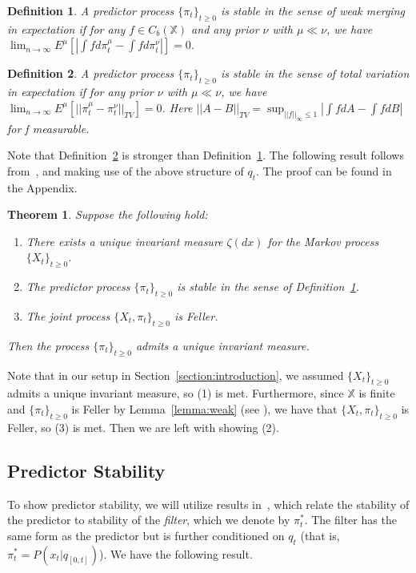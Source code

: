 \documentclass[conference, draftcls, onecolumn]{IEEEtran}
\newtheorem{theorem}{Theorem}
\newtheorem{definition}{Definition}
\begin{document}
\begin{definition}\label{definition:weak_stable}
    A predictor process \(\{\pi_t\}_{t\ge0}\) is stable in the sense of weak merging in expectation if for any \( f \in C_b(\mathbb{X}) \) and any prior \( \nu \) with \( \mu \ll \nu \), we have \( \lim_{n \to \infty}E^\mu [|\int fd\pi_t^\mu - \int fd\pi_t^\nu|] = 0 \).
\end{definition}

\begin{definition}\label{definition:TV_stable}
    A predictor process \(\{\pi_t\}_{t\ge0}\) is stable in the sense of total variation in expectation if for any prior \( \nu \) with \( \mu \ll \nu \), we have \( \lim_{n \to \infty}E^\mu [||\pi_t^\mu - \pi_t^\nu||_{TV}] = 0 \). Here \( ||A-B||_{TV} = \sup_{||f||_\infty \le 1} |\int fdA - \int fdB| \) for f measurable.
\end{definition}

Note that Definition~\ref{definition:TV_stable} is stronger than Definition~\ref{definition:weak_stable}. The following result follows from~\cite[Theorem 2]{Stettner}, and making use of the above structure of \(q_t\). The proof can be found in the Appendix.

\begin{theorem}\label{theorem:unique}
    Suppose the following hold:
    \begin{enumerate}
        \item There exists a unique invariant measure \( \zeta(dx) \) for the Markov process \( \{X_t\}_{t\ge0} \).
        \item The predictor process \( \{\pi_t\}_{t\ge0} \) is stable in the sense of Definition~\ref{definition:weak_stable}.
        \item The joint process \( \{X_t,\pi_t \}_{t\ge0} \) is Feller.
    \end{enumerate}
    Then the process \(\{\pi_t\}_{t\ge0}\) admits a unique invariant measure.
\end{theorem}

Note that in our setup in Section~\ref{section:introduction}, we assumed \( \{X_t\}_{t\ge0} \) admits a unique invariant measure, so (1) is met. Furthermore, since \(\mathbb{X}\) is finite and \(\{\pi_t\}_{t\ge0}\) is Feller by Lemma~\ref{lemma:weak} (see \cite[Definition C.3]{Lerma}), we have that \(\{X_t,\pi_t \}_{t\ge0}\) is Feller, so (3) is met. Then we are left with showing (2).

\subsection{Predictor Stability}
To show predictor stability, we will utilize results in~\cite{Curtis}, which relate the stability of the predictor to stability of the \emph{filter}, which we denote by \(\pi^*_t\). The filter has the same form as the predictor but is further conditioned on \( q_t \) (that is, \( \pi_t^* = P(x_t | q_{[0,t]}) \)). We have the following result.
\end{document}
